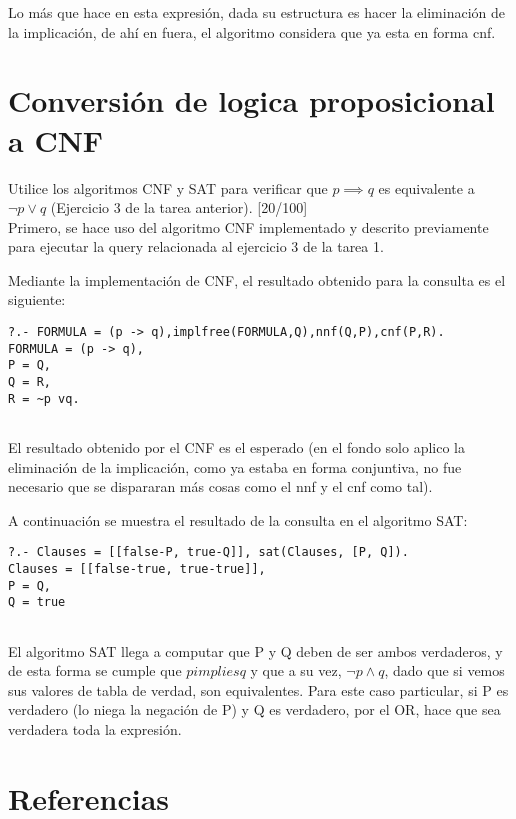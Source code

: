 \documentclass[11pt, letterpaper]{article}
\begin{document}
	Lo más que hace en esta expresión, dada su estructura es hacer la eliminación de la implicación, de ahí en fuera, el algoritmo considera que ya esta en forma cnf.
	
	
	
	
	
	
	
	\newpage

	\section{Conversión de logica proposicional a CNF}

	Utilice los algoritmos CNF y SAT para verificar que $p \implies q$ es equivalente a $\neg p \vee q$ (Ejercicio 3 de la tarea anterior). [20/100] \\
	
	Primero, se hace uso del algoritmo CNF implementado y descrito previamente para ejecutar la query relacionada al ejercicio 3 de la tarea 1. 
	
	Mediante la implementación de CNF, el resultado obtenido para la consulta es el siguiente:

\begin{verbatim}
?.- FORMULA = (p -> q),implfree(FORMULA,Q),nnf(Q,P),cnf(P,R).
FORMULA = (p -> q),
P = Q,
Q = R,
R = ~p vq.
		
\end{verbatim}

	
	El resultado obtenido por el CNF es el esperado (en el fondo solo aplico la eliminación de la implicación, como ya estaba en forma conjuntiva, no fue necesario que se dispararan más cosas como el nnf y el cnf como tal).
	
	A continuación se muestra el resultado de la consulta en el algoritmo SAT:
	
	\begin{verbatim}
?.- Clauses = [[false-P, true-Q]], sat(Clauses, [P, Q]).
Clauses = [[false-true, true-true]],
P = Q, 
Q = true
		
	\end{verbatim}
	
	El algoritmo SAT llega a computar que P y Q deben de ser ambos verdaderos, y de esta forma se cumple que $p implies q$ y que a su vez, $\neg p \wedge q$, dado que si vemos sus valores de tabla de verdad, son equivalentes. Para este caso particular, si P es verdadero (lo niega la negación de P) y Q es verdadero, por el OR, hace que sea verdadera toda la expresión.
	
	
	
	
	
	

		
\newpage


\section{Referencias}  %


	
	
\end{document}
